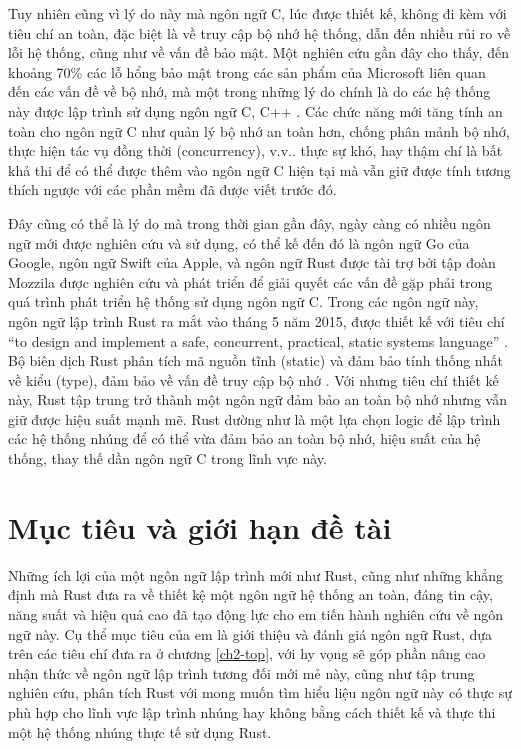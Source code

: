 Tuy nhiên cũng vì lý do này mà ngôn ngữ C, lúc được thiết kế, không đi kèm với tiêu chí an toàn, đặc biệt là về truy cập bộ nhớ hệ thống, dẫn đến nhiều rủi ro về lỗi hệ thống, cũng như về vấn đề bảo mật. Một nghiên cứu gần đây cho thấy, đến khoảng 70\% các lỗ hổng bảo mật trong các sản phẩm của Microsoft liên quan đến các vấn đề về bộ nhớ, mà một trong những lý do chính là do các hệ thống này được lập trình sử dụng ngôn ngữ C, C++ \cite{ms_70}.
Các chức năng mới tăng tính an toàn cho ngôn ngữ C như quản lý bộ nhớ an toàn hơn, chống phân mảnh bộ nhớ, thực hiện tác vụ đồng thời (concurrency), v.v.. thực sự khó, hay thậm chí là bất khả thi để có thể được thêm vào ngôn ngữ C hiện tại mà vẫn giữ được tính tương thích ngược với các phần mềm đã được viết trước đó.

Đây cũng có thể là lý do mà trong thời gian gần đây, ngày càng có nhiều ngôn ngữ mới được nghiên cứu và sử dụng, có thể kế đến đó là ngôn ngữ Go của Google, ngôn ngữ Swift của Apple, và ngôn ngữ Rust được tài trợ bởi tập đoàn Mozzila được nghiên cứu và phát triển để giải quyết các vấn đề gặp phải trong quá trình phát triển hệ thống sử dụng ngôn ngữ C. Trong các ngôn ngữ này, ngôn ngữ lập trình Rust ra mắt vào tháng 5 năm 2015, được thiết kế với tiêu chí ``to design and implement a safe, concurrent, practical, static systems language'' \cite{rust_website}. Bộ biên dịch Rust phân tích mã nguồn tĩnh (static) và đảm bảo tính thống nhất về kiểu (type), đảm bảo về vấn đề truy cập bộ nhớ \cite{phd_safe_type}. Với nhưng tiêu chí thiết kế này, Rust tập trung trở thành một ngôn ngữ đảm bảo an toàn bộ nhớ nhưng vẫn giữ được hiệu suất mạnh mẽ. Rust dường như là một lựa chọn logic để lập trình các hệ thống nhúng để có thể vừa đảm bảo an toàn bộ nhớ, hiệu suất của hệ thống, thay thế dần ngôn ngữ C trong lĩnh vực này.

\section{Mục tiêu và giới hạn đề tài}
Những ích lợi của một ngôn ngữ lập trình mới như Rust, cũng như những khẳng định mà Rust đưa ra về thiết kệ một ngôn ngữ hệ thống an toàn, đáng tin cậy, năng suất và hiệu quả cao đã tạo động lực cho em tiến hành nghiên cứu về ngôn ngữ này. Cụ thể mục tiêu của em là giới thiệu và đánh giá ngôn ngữ Rust, dựa trên các tiêu chí đưa ra ở chương \ref{ch2-top}, với hy vọng sẽ góp phần nâng cao nhận thức về ngôn ngữ lập trình tương đối mới mẻ này, cũng như tập trung nghiên cứu, phân tích Rust với mong muốn tìm hiểu liệu ngôn ngữ này có thực sự phù hợp cho lĩnh vực lập trình nhúng hay không bằng cách thiết kế và thực thi một hệ thống nhúng thực tế sử dụng Rust.

